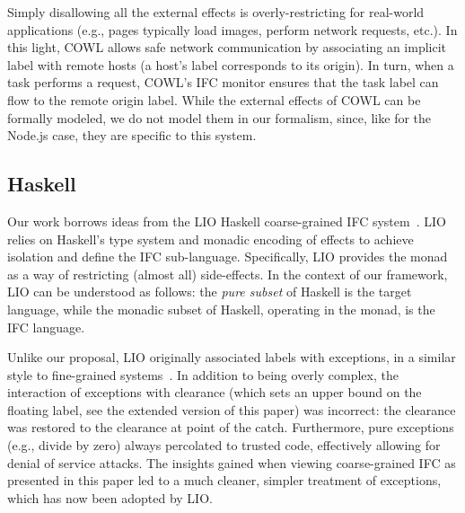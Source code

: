 \documentclass{llncs}
\newif\ifextended
\newcommand{\appref}[1]{\ifextended Appendix~\ref{#1}\else the extended version of this paper\fi }
\begin{document}
Simply disallowing all the external effects is overly-restricting for
real-world applications (e.g., pages typically load images, perform
network requests, etc.).
In this light, COWL allows safe network communication by associating an
implicit label with remote hosts (a host's label corresponds to
its origin).
In turn, when a task performs a request, COWL's IFC monitor
ensures that the task label can flow to the remote origin label.
While the external effects of COWL can be formally modeled, we do not
model them in our formalism, since, like for the
Node.js case, they are specific to this system.




\subsection{Haskell}
\label{sec:real:hs}
Our work borrows ideas from the LIO Haskell coarse-grained IFC
system~\cite{lio, stefan:addressing-covert}.
LIO relies on Haskell's type system and monadic encoding of
effects to achieve isolation and define the IFC sub-language.
Specifically, LIO provides the  monad as a way of restricting
(almost all) side-effects.
In the context of our framework, LIO can be understood as follows: the
\emph{pure subset} of Haskell is the target language, while the
monadic subset of Haskell, operating in the  monad, is the
IFC language.

Unlike our proposal, LIO originally associated labels with exceptions, in a
similar style to fine-grained
systems~\cite{stefan:2012:arxiv-flexible, Hritcu:2013:YIB:2497621.2498098}.
In addition to being overly complex, the interaction of exceptions
with clearance (which sets an upper bound on the floating label, see
\appref{sec:clearance}) was incorrect: the clearance
was restored to the clearance at point of the catch.
Furthermore, pure exceptions (e.g., divide by zero) always percolated to
trusted code, effectively allowing for denial of service attacks.
The insights gained when viewing coarse-grained IFC as presented in this
paper led to a much cleaner, simpler treatment of exceptions,
which has now been adopted by LIO.
\end{document}
